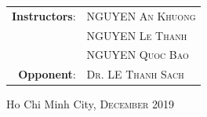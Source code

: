 \begin{titlingpage}
\begin{singlespace}
\begin{center}
\vspace{8mm}
\begin{center}
\begin{tabular}{ r l }
\textbf{Instructors}:& \Large \textsc{NGUYEN An Khuong}\\
& \Large \textsc{NGUYEN Le Thanh}\\
& \Large \textsc{NGUYEN Quoc Bao}\\
\textbf{Opponent}:& \Large \textsc{Dr. LE Thanh Sach}\\
\end{tabular}
\end{center}
\vspace{6mm}
{\large Ho Chi Minh City, \textsc{December 2019}}
\vspace{12mm}
\end{center}
\end{singlespace}
\end{titlingpage}
